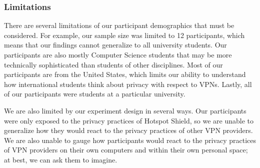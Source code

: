 \subsubsection{Limitations}
There are several limitations of our participant demographics that must be considered.
For example, our sample size was limited to 12 participants, which means that our findings cannot generalize to all university students.
Our participants are also mostly Computer Science students that may be more technically sophisticated than students of other disciplines.
Most of our participants are from the United States, which limits our ability to understand how international students think about privacy with respect to VPNs.
Lastly, all of our participants were students at a particular university.

We are also limited by our experiment design in several ways.
Our participants were only exposed to the privacy practices of Hotspot Shield, so we are unable to generalize how they would react to the privacy practices of other VPN providers.
We are also unable to gauge how participants would react to the privacy practices of VPN providers on their own computers and within their own personal space; at best, we can ask them to imagine.
